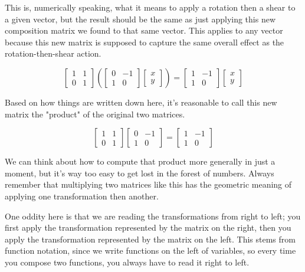 This is, numerically speaking, what it means to apply a rotation then a shear to
a given vector, but the result should be the same as just applying this new
composition matrix we found to that same vector. This applies to any vector
because this new matrix is supposed to capture the same overall effect as the
rotation-then-shear action.

\begin{equation*}
  \begin{bmatrix}
    1 & 1 \\
    0 & 1
  \end{bmatrix}\left(
  \begin{bmatrix}
    0 & -1 \\
    1 & 0
  \end{bmatrix}
  \begin{bmatrix}
    x \\
    y
  \end{bmatrix}\right) =
  \begin{bmatrix}
    1 & -1 \\
    1 & 0
  \end{bmatrix} \begin{bmatrix}
    x \\
    y
  \end{bmatrix}
\end{equation*}

Based on how things are written down here, it's reasonable to call this new
matrix the "product" of the original two matrices.

\begin{equation*}
  \begin{bmatrix}
    1 & 1 \\
    0 & 1
  \end{bmatrix}
  \begin{bmatrix}
    0 & -1 \\
    1 & 0
  \end{bmatrix} =
  \begin{bmatrix}
    1 & -1 \\
    1 & 0
  \end{bmatrix}
\end{equation*}

We can think about how to compute that product more generally in just a moment,
but it's way too easy to get lost in the forest of numbers. Always remember
that multiplying two matrices like this has the geometric meaning of applying
one transformation then another.

One oddity here is that we are reading the transformations from right to left;
you first apply the transformation represented by the matrix on the right, then
you apply the transformation represented by the matrix on the left. This stems
from function notation, since we write functions on the left of variables, so
every time you compose two functions, you always have to read it right to left.

